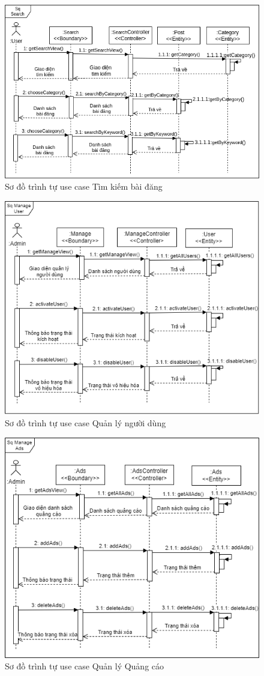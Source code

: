 \documentclass[../DoAn.tex]{subfiles}
\begin{document}
\begin{figure}[H]
    \centering
    \includegraphics[width=0.85\linewidth]{Hinhve/SearchSequence.png}
    \caption{Sơ đồ trình tự use case Tìm kiếm bài đăng}
    \label{fig:Fig1}
\end{figure}
\newpage
\begin{figure}[H]
    \centering
    \includegraphics[width=0.85\linewidth]{Hinhve/ManageUserSequence.png}
    \caption{Sơ đồ trình tự use case Quản lý người dùng}
    \label{fig:Fig1}
\end{figure}
\begin{figure}[H]
    \centering
    \includegraphics[width=0.85\linewidth]{Hinhve/adsSequence.png}
\caption{Sơ đồ trình tự use case Quản lý Quảng cáo}
    \label{fig:Fig1}
\end{figure}
\newpage
\end{document}
